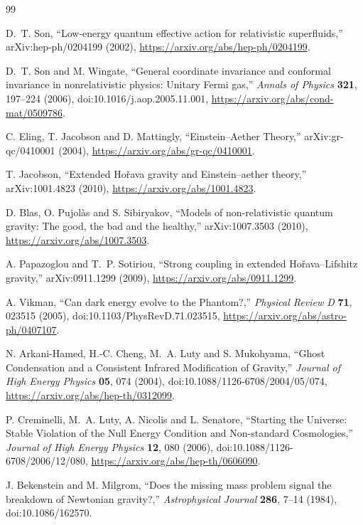\begin{thebibliography}{99}
\small

D.~T. Son,
``Low-energy quantum effective action for relativistic superfluids,''
arXiv:hep-ph/0204199 (2002),
\url{https://arxiv.org/abs/hep-ph/0204199}.

D.~T. Son and M. Wingate,
``General coordinate invariance and conformal invariance in nonrelativistic
physics: Unitary Fermi gas,''
\emph{Annals of Physics} \textbf{321}, 197--224 (2006),
doi:10.1016/j.aop.2005.11.001,
\url{https://arxiv.org/abs/cond-mat/0509786}.

C. Eling, T. Jacobson and D. Mattingly,
``Einstein--Aether Theory,''
arXiv:gr-qc/0410001 (2004),
\url{https://arxiv.org/abs/gr-qc/0410001}.

T. Jacobson,
``Extended Hořava gravity and Einstein--aether theory,''
arXiv:1001.4823 (2010),
\url{https://arxiv.org/abs/1001.4823}.

D. Blas, O. Pujolàs and S. Sibiryakov,
``Models of non-relativistic quantum gravity: The good, the bad and the
healthy,''
arXiv:1007.3503 (2010),
\url{https://arxiv.org/abs/1007.3503}.

A. Papazoglou and T.~P. Sotiriou,
``Strong coupling in extended Hořava--Lifshitz gravity,''
arXiv:0911.1299 (2009),
\url{https://arxiv.org/abs/0911.1299}.

A. Vikman,
``Can dark energy evolve to the Phantom?,''
\emph{Physical Review D} \textbf{71}, 023515 (2005),
doi:10.1103/PhysRevD.71.023515,
\url{https://arxiv.org/abs/astro-ph/0407107}.

N. Arkani-Hamed, H.-C. Cheng, M.~A. Luty and S. Mukohyama,
``Ghost Condensation and a Consistent Infrared Modification of Gravity,''
\emph{Journal of High Energy Physics} \textbf{05}, 074 (2004),
doi:10.1088/1126-6708/2004/05/074,
\url{https://arxiv.org/abs/hep-th/0312099}.

P. Creminelli, M.~A. Luty, A. Nicolis and L. Senatore,
``Starting the Universe: Stable Violation of the Null Energy Condition and
Non-standard Cosmologies,''
\emph{Journal of High Energy Physics} \textbf{12}, 080 (2006),
doi:10.1088/1126-6708/2006/12/080,
\url{https://arxiv.org/abs/hep-th/0606090}.

J. Bekenstein and M. Milgrom,
``Does the missing mass problem signal the breakdown of Newtonian gravity?,''
\emph{Astrophysical Journal} \textbf{286}, 7--14 (1984),
doi:10.1086/162570.


\end{thebibliography}
